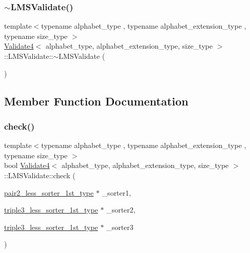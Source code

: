 \subsubsection{\texorpdfstring{$\sim$\+L\+M\+S\+Validate()}{~LMSValidate()}}
{\footnotesize\ttfamily template$<$typename alphabet\+\_\+type , typename alphabet\+\_\+extension\+\_\+type , typename size\+\_\+type $>$ \\
\hyperlink{class_validate4}{Validate4}$<$ alphabet\+\_\+type, alphabet\+\_\+extension\+\_\+type, size\+\_\+type $>$\+::L\+M\+S\+Validate\+::$\sim$\+L\+M\+S\+Validate (\begin{DoxyParamCaption}{ }\end{DoxyParamCaption})\hspace{0.3cm}{\ttfamily [inline]}}



\subsection{Member Function Documentation}
\mbox{\label{struct_validate4_1_1_l_m_s_validate_a906ef49f72b8a2baa0d7a2d196c4b62e}} 
\subsubsection{\texorpdfstring{check()}{check()}}
{\footnotesize\ttfamily template$<$typename alphabet\+\_\+type , typename alphabet\+\_\+extension\+\_\+type , typename size\+\_\+type $>$ \\
bool \hyperlink{class_validate4}{Validate4}$<$ alphabet\+\_\+type, alphabet\+\_\+extension\+\_\+type, size\+\_\+type $>$\+::L\+M\+S\+Validate\+::check (\begin{DoxyParamCaption}\item[{\hyperlink{class_validate4_ad945003027abfd152a0e177d7541580d}{pair2\+\_\+less\+\_\+sorter\+\_\+1st\+\_\+type} $\ast$}]{\+\_\+sorter1,  }\item[{\hyperlink{class_validate4_ac2e4bde5df51eeff18ef5591d76e63dc}{triple3\+\_\+less\+\_\+sorter\+\_\+1st\+\_\+type} $\ast$}]{\+\_\+sorter2,  }\item[{\hyperlink{class_validate4_ac2e4bde5df51eeff18ef5591d76e63dc}{triple3\+\_\+less\+\_\+sorter\+\_\+1st\+\_\+type} $\ast$}]{\+\_\+sorter3 }\end{DoxyParamCaption})\hspace{0.3cm}{\ttfamily [inline]}}



